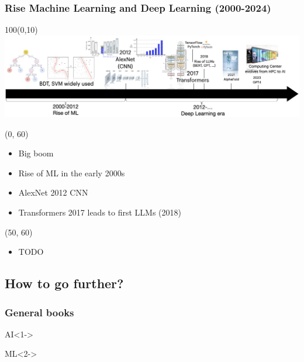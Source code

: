 \begin{frame}
  \frametitle{Rise Machine Learning and Deep Learning (2000-2024)}

  \begin{textblock}{100}(0,10)
    \includegraphics[width=\textwidth]{img/ai_history_2000_2024.png}
  \end{textblock}

  \begin{textblock}{50}(0, 60)
    \begin{itemize}
      \item Big boom
      \item Rise of ML in the early 2000s
      \item AlexNet 2012 CNN
      \item Transformers 2017 leads to first LLMs (2018)
  \end{itemize}
  \end{textblock}

  \begin{textblock}{50}(50, 60)
    \begin{itemize}
      \item TODO
    \end{itemize}
  \end{textblock}

\end{frame}

\subsection{How to go further?}

\begin{frame}
  \frametitle{General books}

  \nocite{*}

  \begin{block}{AI}<1->
    \printbibliography[heading=none,category=AI]
  \end{block}

  \begin{block}{\ac{ML}}<2->
    \printbibliography[heading=none,category=ML]
  \end{block}
\end{frame}

